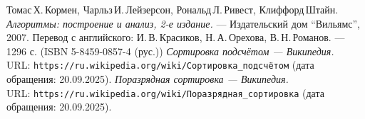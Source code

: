 \begin{thebibliography}{99}
Томас\,Х.\,Кормен, Чарльз\,И.\,Лейзерсон, Рональд\,Л.\,Ривест, Клиффорд\,Штайн.
{\itshape Алгоритмы: построение и анализ, 2-е издание.} --- Издательский дом \enquote{Вильямс}, 2007. Перевод с английского: И.\,В.\,Красиков, Н.\,А.\,Орехова, В.\,Н.\,Романов. --- 1296 с. (ISBN 5-8459-0857-4 (рус.))
{\itshape Сортировка подсчётом — Википедия.} \\URL: \texttt{https://ru.wikipedia.org/wiki/Сортировка\_подсчётом} (дата обращения: 20.09.2025).
{\itshape Поразрядная сортировка — Википедия.} \\URL: \texttt{https://ru.wikipedia.org/wiki/Поразрядная\_сортировка} (дата обращения: 20.09.2025).
\end{thebibliography}
\pagebreak


